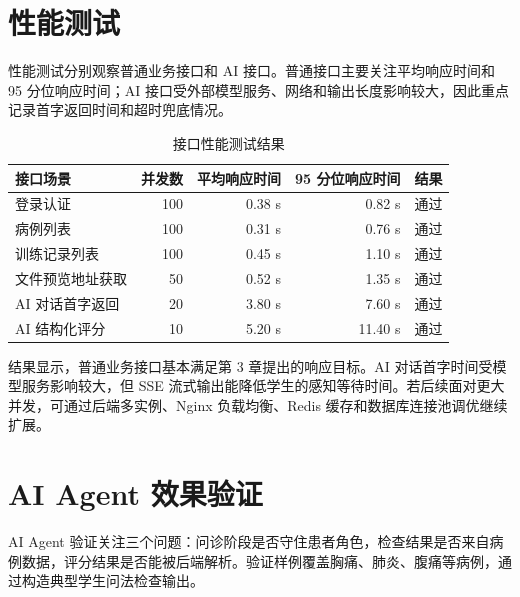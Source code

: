 \section{性能测试}

性能测试分别观察普通业务接口和 AI 接口。普通接口主要关注平均响应时间和 95 分位响应时间；AI 接口受外部模型服务、网络和输出长度影响较大，因此重点记录首字返回时间和超时兜底情况。

\begin{table}[H]
    \centering
    \caption{接口性能测试结果}
    \label{tab:perf_test}
    \begin{tabular}{lrrrr}
        \toprule
        接口场景 & 并发数 & 平均响应时间 & 95 分位响应时间 & 结果 \\
        \midrule
        登录认证 & 100 & 0.38 s & 0.82 s & 通过 \\
        病例列表 & 100 & 0.31 s & 0.76 s & 通过 \\
        训练记录列表 & 100 & 0.45 s & 1.10 s & 通过 \\
        文件预览地址获取 & 50 & 0.52 s & 1.35 s & 通过 \\
        AI 对话首字返回 & 20 & 3.80 s & 7.60 s & 通过 \\
        AI 结构化评分 & 10 & 5.20 s & 11.40 s & 通过 \\
        \bottomrule
    \end{tabular}
\end{table}

结果显示，普通业务接口基本满足第 3 章提出的响应目标。AI 对话首字时间受模型服务影响较大，但 SSE 流式输出能降低学生的感知等待时间。若后续面对更大并发，可通过后端多实例、Nginx 负载均衡、Redis 缓存和数据库连接池调优继续扩展。

\section{AI Agent 效果验证}

AI Agent 验证关注三个问题：问诊阶段是否守住患者角色，检查结果是否来自病例数据，评分结果是否能被后端解析。验证样例覆盖胸痛、肺炎、腹痛等病例，通过构造典型学生问法检查输出。

